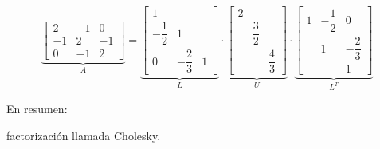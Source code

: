 \documentclass[12pt]{article}
\begin{document}
\[\underbrace{\begin{bmatrix}
2 & -1 & 0 \\ 
-1 & 2 & -1 \\ 
0 & -1 & 2
\end{bmatrix} }_A=\underbrace{\begin{bmatrix}
1 &  &  \\ 
-\dfrac{1}{2} & 1 &  \\ 
0 & -\dfrac{2}{3} & 1
\end{bmatrix} }_L\cdot\underbrace{\begin{bmatrix}
2 &  &  \\ 
 & \dfrac{3}{2} &  \\ 
 &  & \dfrac{4}{3}
\end{bmatrix} }_U\cdot\underbrace{\begin{bmatrix}
1 & -\dfrac{1}{2} & 0 \\ 
 & 1 & -\dfrac{2}{3} \\ 
 &  & 1
\end{bmatrix} }_{L^T}\]



En resumen:\begin{center}
\end{center}factorización llamada Cholesky.
\end{document}
